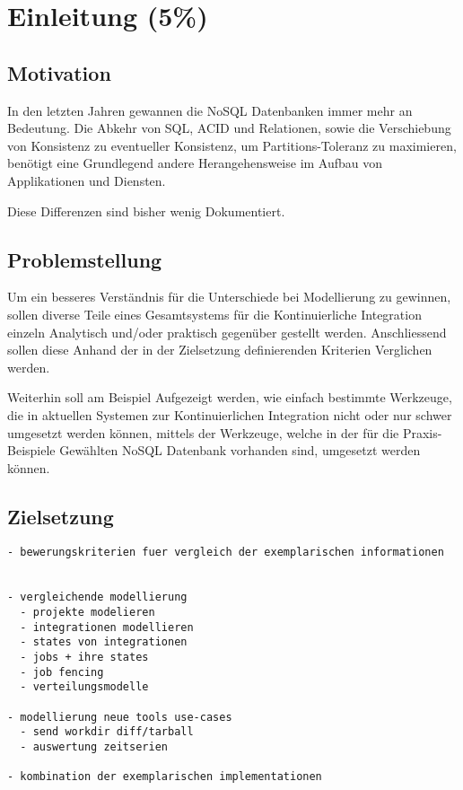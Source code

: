 \chapter{Einleitung (5\%) }

\section{Motivation}

In den letzten Jahren gewannen die NoSQL Datenbanken immer mehr an Bedeutung.
Die Abkehr von SQL, ACID und Relationen, sowie die Verschiebung von Konsistenz zu eventueller Konsistenz, um Partitions-Toleranz zu maximieren,
benötigt eine Grundlegend andere Herangehensweise im Aufbau von Applikationen und Diensten.

Diese Differenzen sind bisher wenig Dokumentiert.

\section{Problemstellung}

Um ein besseres Verständnis für die Unterschiede bei Modellierung zu gewinnen,
sollen diverse Teile eines Gesamtsystems für die Kontinuierliche Integration einzeln Analytisch und/oder praktisch gegenüber gestellt werden.
Anschliessend sollen diese Anhand der in der Zielsetzung definierenden Kriterien Verglichen werden.

Weiterhin soll am Beispiel Aufgezeigt werden, wie einfach bestimmte Werkzeuge,
die in aktuellen Systemen zur Kontinuierlichen Integration nicht oder nur schwer umgesetzt werden können,
mittels der Werkzeuge, welche in der für die Praxis-Beispiele Gewählten NoSQL Datenbank vorhanden sind,
umgesetzt werden können.



\section{Zielsetzung}




\begin{verbatim}
- bewerungskriterien fuer vergleich der exemplarischen informationen


- vergleichende modellierung
  - projekte modelieren
  - integrationen modellieren
  - states von integrationen
  - jobs + ihre states
  - job fencing
  - verteilungsmodelle

- modellierung neue tools use-cases
  - send workdir diff/tarball
  - auswertung zeitserien

- kombination der exemplarischen implementationen


\end{verbatim}

